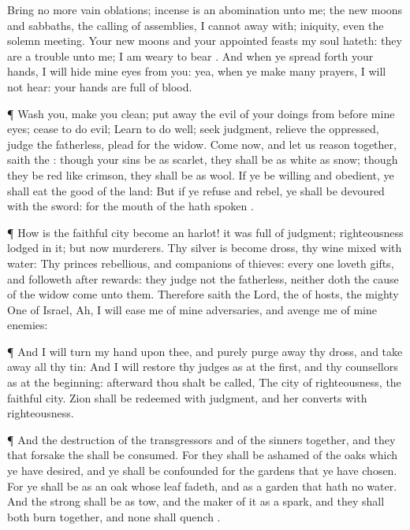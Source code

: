 {Bring no
more
vain
oblations;
incense is an
abomination unto me; the new
moons and
sabbaths, the
calling of
assemblies, I cannot away
with;
{}
iniquity, even the solemn
meeting.
Your new
moons and your appointed
feasts my
soul
hateth: they are a
trouble unto me; I am
weary to
bear
{}.
And when ye spread
forth your
hands, I will
hide mine
eyes from you: yea, when ye make
many
prayers, I will not
hear: your
hands are
full of
blood.
\par }{\PP {}¶
Wash you, make you
clean; put
away the
evil of your
doings from
before mine
eyes;
cease to do
evil;
Learn to do
well;
seek
judgment,
relieve the
oppressed,
judge the
fatherless,
plead for the
widow.
Come
now, and let us reason
together,
saith the
{}: though your
sins be as
scarlet, they shall be as
white as
snow; though they be
red like
crimson, they shall be as
wool.
If ye be
willing and
obedient, ye shall
eat the
good of the
land:
But if ye
refuse and
rebel, ye shall be
devoured with the
sword: for the
mouth of the
{} hath
spoken
{}.
\par }{\PP {}¶ How is the
faithful
city become an
harlot! it was
full of
judgment;
righteousness
lodged in it; but now
murderers.
Thy
silver is become
dross, thy
wine
mixed with
water:
Thy
princes
{}
rebellious, and
companions of
thieves: every one
loveth
gifts, and
followeth after
rewards: they
judge not the
fatherless, neither doth the
cause of the
widow
come unto them.
Therefore
saith the
Lord, the
{} of
hosts, the mighty
One of
Israel,
Ah, I will
ease me of mine
adversaries, and
avenge me of mine
enemies:
\par }{\PP {}¶ And I will
turn my
hand upon thee, and
purely purge
away thy
dross, and take
away all thy
tin:
And I will
restore thy
judges as at the
first, and thy
counsellors as at the
beginning:
afterward thou shalt be
called, The
city of
righteousness, the
faithful
city.
Zion shall be
redeemed with
judgment, and her
converts with
righteousness.
\par }{\PP {}¶ And the
destruction of the
transgressors and of the
sinners
{}
together, and they that
forsake the
{} shall be
consumed.
For they shall be
ashamed of the
oaks which ye have
desired, and ye shall be
confounded for the
gardens that ye have
chosen.
For ye shall be as an
oak whose
leaf
fadeth, and as a
garden that hath no
water.
And the
strong shall be as
tow, and the
maker of it as a
spark, and they shall
both
burn
together, and none shall
quench
{}.

}
